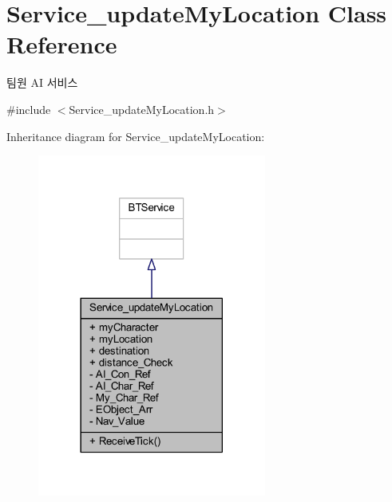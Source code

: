 \hypertarget{class_service__update_my_location}{}\section{Service\+\_\+update\+My\+Location Class Reference}
\label{class_service__update_my_location}


팀원 AI 서비스  




{\ttfamily \#include $<$Service\+\_\+update\+My\+Location.\+h$>$}



Inheritance diagram for Service\+\_\+update\+My\+Location\+:\nopagebreak
\begin{figure}[H]
\begin{center}
\leavevmode
\includegraphics[width=213pt]{class_service__update_my_location__inherit__graph}
\end{center}
\end{figure}


